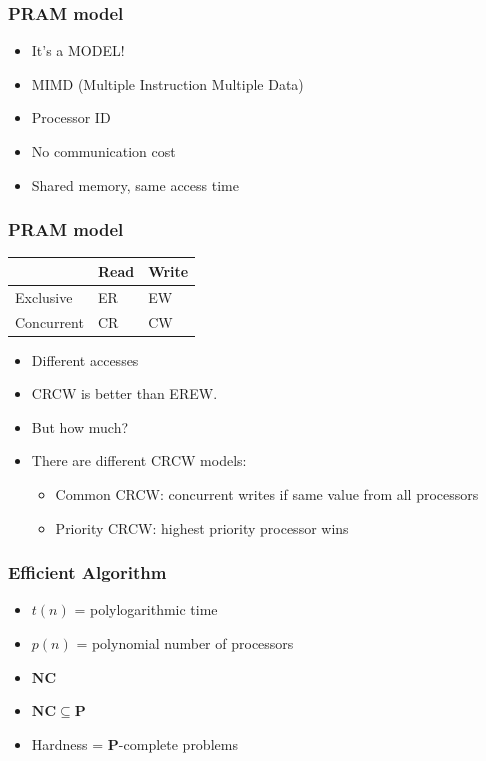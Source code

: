 \documentclass[12pt,aspectratio=169]{beamer}
\begin{document}
\begin{frame}\frametitle{PRAM model}
  \begin{itemize}
  \item
    It's a \alert{MODEL}!
  \item
    MIMD (Multiple Instruction Multiple Data)
  \item
    Processor ID
  \item
      No communication cost
  \item
      Shared memory, same access time
  \end{itemize}
\end{frame}

\begin{frame}\frametitle{PRAM model}
\begin{center}
  \begin{tabular}{|l|l|l|}
\hline
 & Read & Write \\
\hline
Exclusive & ER & EW \\
\hline
Concurrent & CR & CW \\
\hline
\end{tabular}

\begin{itemize}
\item
  Different accesses
  \item
    CRCW is better than EREW.
  \item
    But how much?
\item
    There are different CRCW models:
    \begin{itemize}
  \item
    Common CRCW: concurrent writes if same value from all processors
  \item
    Priority CRCW: highest priority processor wins
    \end{itemize}
\end{itemize}
\end{center}
\end{frame}


\begin{frame}\frametitle{Efficient Algorithm}
\begin{itemize}
\item
  $t(n)$ = polylogarithmic time
\item
  $p(n)$ = polynomial number of processors
\item
  $\mathbf{NC}$
\item
  $\mathbf{NC}\subseteq \mathbf{P}$
\item
  Hardness = $\mathbf{P}$-complete problems
\end{itemize}
\end{frame}
\end{document}

